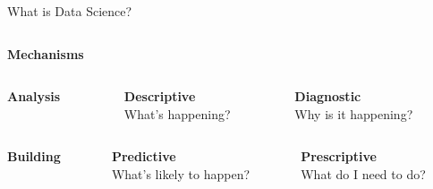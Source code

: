 \begin{frame}{What is Data Science?}
{\begin{columns}[c]
\begin{column}{0.375\textwidth}
\begin{center}
                    \Large\bf%
                    Mechanisms
                \end{center}
            \end{column}
        \end{columns}
        \vfill
        \begin{columns}[c]
            \begin{column}{0.25\textwidth}
                \begin{center}
                    \Large\bf%
                    Analysis
                \end{center}
            \end{column}
            \begin{column}{0.375\textwidth}
                \begin{center}
                    \textbf{Descriptive} \\
                    What's happening?
                \end{center}
            \end{column}
            \begin{column}{0.375\textwidth}
                \begin{center}
                    \textbf{Diagnostic} \\
                    Why is it happening?
                \end{center}
            \end{column}
        \end{columns}
        \vfill
        \begin{columns}[c]
            \begin{column}{0.25\textwidth}
                \begin{center}
                    \Large\bf%
                    Building
                \end{center}
            \end{column}
            \begin{column}{0.375\textwidth}
                \begin{center}
                    \textbf{Predictive} \\
                    What's likely to happen?
                \end{center}
            \end{column}
            \begin{column}{0.375\textwidth}
                \begin{center}
                   \textbf{Prescriptive} \\
                   What do I need to do?
                \end{center}
            \end{column}
        \end{columns}}
\end{frame}

